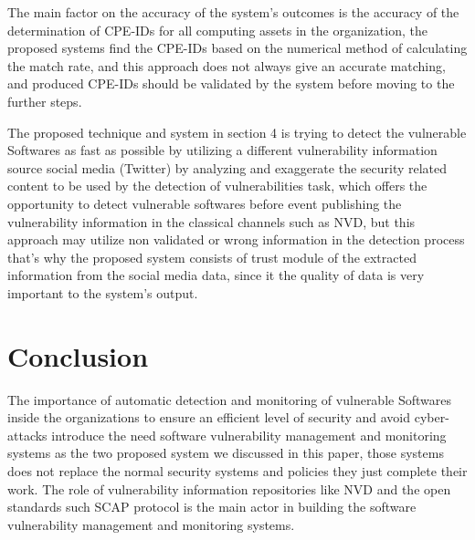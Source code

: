 \documentclass{llncs}
\begin{document}
\par The main factor on the accuracy of the system's outcomes is the accuracy of the determination of CPE-IDs for all computing assets in the organization, the proposed systems find the CPE-IDs based on the numerical method of calculating the match rate, and this approach does not always give an accurate matching, and produced CPE-IDs should be validated by the system before moving to the further steps.


\par The proposed technique and system in section 4 is trying to detect the vulnerable Softwares as fast as possible by utilizing a different vulnerability information source social media (Twitter) by analyzing and exaggerate the security related content to be used by the detection of vulnerabilities task, which offers the opportunity to detect vulnerable softwares before event publishing the vulnerability information in the classical channels such as NVD, but this approach may utilize non validated or wrong information in the detection process that's why the proposed system consists of trust module of the extracted information from the social media data, since it the quality of data is very important to the system's output. 
      
\section{Conclusion}

\par The importance of automatic detection and monitoring of vulnerable Softwares inside the organizations to ensure an efficient level of security and avoid cyber-attacks introduce the need software vulnerability management and monitoring systems as the two proposed system we discussed in this paper,  those systems does not replace the normal security systems and policies they just complete their work. The role of vulnerability information repositories like NVD and the open standards such SCAP protocol is the main actor in building the software vulnerability management and monitoring systems.   
\end{document}
